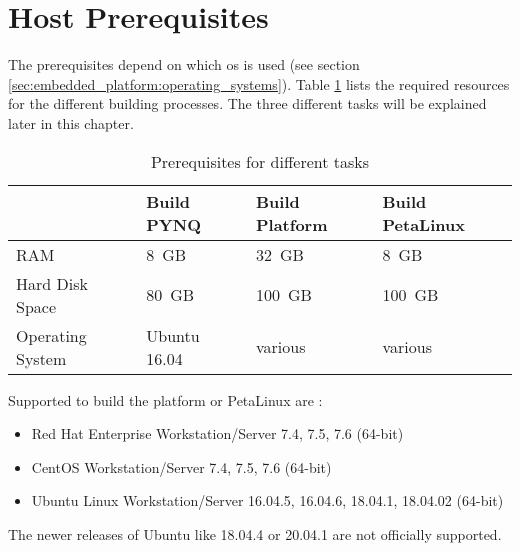 \section{Host Prerequisites}
\label{sec:embedded_platform:host_prerequisites}

The prerequisites depend on which \acrshort{os} is used (see section \ref{sec:embedded_platform:operating_systems}).
Table \ref{tab:prerequisits_hardware} lists the required resources for the different building processes.
The three different tasks will be explained later in this chapter.

\begin{table}[b]
  \caption{Prerequisites for different tasks}
  \label{tab:prerequisits_hardware}
  \centering
  \begin{tabular}{llll}
    \toprule
     & \textbf{Build PYNQ} \cite{avnet_pynq_github} & \textbf{Build Platform} \cite{vitis_user_guide} & \textbf{Build PetaLinux} \cite{petalinux_user_guide} \\
    \midrule
    RAM & \SI{8}{GB} & \SI{32}{GB} & \SI{8}{GB} \\
    Hard Disk Space & \SI{80}{GB} & \SI{100}{GB} & \SI{100}{GB} \\
    Operating System & Ubuntu 16.04 & various & various \\
    \bottomrule
  \end{tabular}
\end{table}

Supported  to build the platform or PetaLinux are \cite{vitis_user_guide, petalinux_user_guide}:

\begin{itemize}
  \item Red Hat Enterprise Workstation/Server 7.4, 7.5, 7.6 (64-bit)
  \item CentOS Workstation/Server 7.4, 7.5, 7.6 (64-bit)
  \item Ubuntu Linux Workstation/Server 16.04.5, 16.04.6, 18.04.1, 18.04.02 (64-bit)
\end{itemize}

The newer releases of Ubuntu like 18.04.4 or 20.04.1 are not officially supported.
